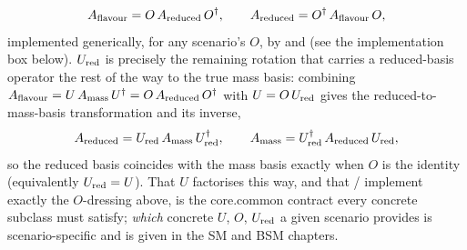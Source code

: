 \begin{theorybox}
\begin{equation}
  A_{\rm flavour} = O\,A_{\rm reduced}\,O^\dagger,
  \qquad
  A_{\rm reduced} = O^\dagger\,A_{\rm flavour}\,O,
\end{equation}
implemented generically, for any scenario's $O$, by 
and  (see the implementation box below). $U_{\rm
red}$ is precisely the remaining rotation that carries a reduced-basis
operator the rest of the way to the true mass basis: combining
$A_{\rm flavour}=U\,A_{\rm mass}\,U^\dagger=O\,A_{\rm reduced}\,O^\dagger$
with $U=O\,U_{\rm red}$ gives the reduced-to-mass-basis transformation and
its inverse,
\begin{equation}
  A_{\rm reduced} = U_{\rm red}\,A_{\rm mass}\,U_{\rm red}^\dagger,
  \qquad
  A_{\rm mass} = U_{\rm red}^\dagger\,A_{\rm reduced}\,U_{\rm red},
\end{equation}
so the reduced basis coincides with the mass basis exactly when $O$ is the
identity (equivalently $U_{\rm red}=U$).
That $U$ factorises this way, and that /%
 implement exactly the $O$-dressing above, is the
core.common contract every concrete  subclass must satisfy;
\emph{which} concrete $U$, $O$, $U_{\rm red}$ a given scenario provides is
scenario-specific and is given in the SM and BSM chapters.
\end{theorybox}

